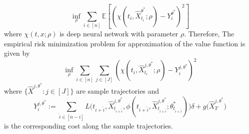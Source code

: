 \documentclass{article}
\numberwithin{equation}{section}
\begin{document}
\begin{equation}
    \inf_\rho \sum_{i\in[n]}\mathbb{E}\left[\left(\chi(t_i,\hat{X}^{\theta^*}_{t_{i}};\rho)-Y^{\theta^*}_i\right)^2\right]
\end{equation}
 where $\chi(t,x;\rho)$ is deep neural network with parameter $\rho$. Therefore,
The empirical risk minimization problem for approximation of the value function is given by
\begin{equation}\label{value_fnc:risk_minimization}
    \inf_\rho \sum_{i\in[n]}\sum_{j\in[J]}\left(\chi(t_i,\hat{X}^{j,\theta^*}_{t_{i}};\rho)-Y^{j,\theta^*}_i\right)^2
\end{equation}
where $\{\hat{X}^{j,\theta^*}:j\in[J]\}$ are sample trajectories and
\begin{equation}
    Y^{j,\theta^*}_i:=\sum_{\hat{i}\in[n-i]}L\big(t_{i+\hat{i}},\hat{X}^{j,\theta^{*}}_{t_{i+\hat{i}}}, \phi(t_{i+\hat{i}},\hat{X}^{j,\theta^{*}}_{t_{i+\hat{i}}};\theta^{*}_{t_{i+\hat{i}}})\big)\delta + g\big(\hat{X}_T^{j,\theta^{*}}\big)
\end{equation}
is the corresponding cost along the sample trajectories.
\end{document}
